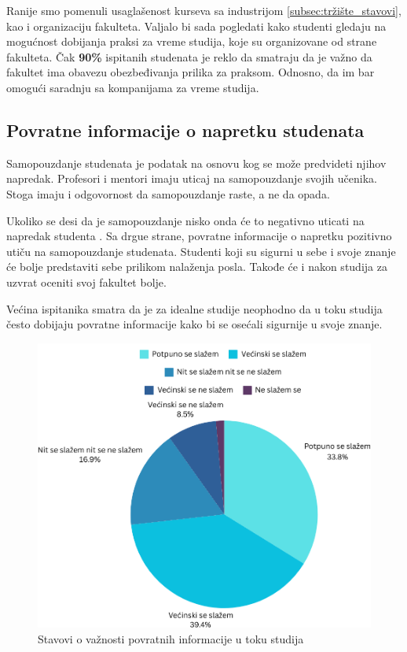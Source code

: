 \documentclass[a4paper]{article}
\begin{document}
{Ranije smo pomenuli usaglašenost kurseva sa industrijom \ref{subsec:tržište_stavovi}, kao i organizaciju fakulteta. Valjalo bi sada pogledati kako studenti gledaju na mogućnost dobijanja praksi za vreme studija, koje su organizovane od strane fakulteta. Čak \textbf{90\%} ispitanih studenata je reklo da smatraju da je važno da fakultet ima obavezu obezbeđivanja prilika za praksom. Odnosno, da im bar omogući saradnju sa kompanijama za vreme studija.

\subsection{Povratne informacije o napretku studenata}
\label{subsec:povrane_informacije}

Samopouzdanje studenata je podatak na osnovu kog se može predvideti njihov napredak\cite{correlation}.
Profesori i mentori imaju uticaj na samopouzdanje svojih učenika. Stoga imaju i odgovornost da samopouzdanje raste, a ne da opada.

Ukoliko se desi da je samopouzdanje nisko onda će to negativno uticati na napredak studenta \cite{confidence}. Sa drgue strane, povratne informacije o napretku pozitivno utiču na samopouzdanje studenata. Studenti koji su sigurni u sebe i svoje znanje će bolje predstaviti sebe prilikom nalaženja posla. Takođe će i nakon studija za uzvrat oceniti svoj fakultet bolje. 

Većina ispitanika smatra da je za idealne studije neophodno da u toku studija često dobijaju povratne informacije kako bi se osećali sigurnije u svoje znanje. 
\begin{figure}[h!]
\begin{center}
    \includegraphics[scale = 0.3]{PieChartPovratneInformacije.png}
    \caption{Stavovi o važnosti povratnih informacije u toku studija}
    \label{fig:povratne_informacije}
\end{center}
\end{figure}

}
\end{document}
